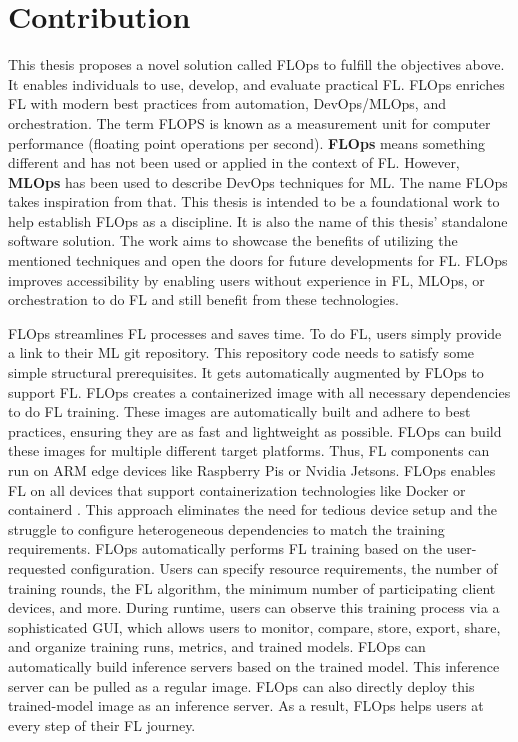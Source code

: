 \section{Contribution}

This thesis proposes a novel solution called FLOps to fulfill the objectives above.
It enables individuals to use, develop, and evaluate practical FL.
FLOps enriches FL with modern best practices from automation, DevOps/MLOps, and orchestration.
The term FLOPS is known as a measurement unit for computer performance (floating point operations per second).
\textbf{FLOps} means something different and has not been used or applied in the context of FL.
However, \textbf{MLOps} has been used to describe DevOps techniques for ML.
The name FLOps takes inspiration from that.
This thesis is intended to be a foundational work to help establish FLOps as a discipline.
It is also the name of this thesis' standalone software solution.
The work aims to showcase the benefits of utilizing the mentioned techniques and open the doors for future developments for FL.
FLOps improves accessibility by enabling users without experience in FL, MLOps, or orchestration to do FL and still benefit from these technologies.

FLOps streamlines FL processes and saves time.
To do FL, users simply provide a link to their ML git repository.
This repository code needs to satisfy some simple structural prerequisites.
It gets automatically augmented by FLOps to support FL.
FLOps creates a containerized image with all necessary dependencies to do FL training.
These images are automatically built and adhere to best practices, ensuring they are as fast and lightweight as possible.
FLOps can build these images for multiple different target platforms.
Thus, FL components can run on ARM edge devices like Raspberry Pis or Nvidia Jetsons.
FLOps enables FL on all devices that support containerization technologies like Docker or containerd \cite{containerd_docs}.
This approach eliminates the need for tedious device setup and the struggle to configure heterogeneous dependencies to match the training requirements.
FLOps automatically performs FL training based on the user-requested configuration.
Users can specify resource requirements, the number of training rounds, the FL algorithm, the minimum number of participating client devices, and more.
During runtime, users can observe this training process via a sophisticated GUI, which allows users to monitor, compare, store, export, share, and organize training runs, metrics, and trained models.
FLOps can automatically build inference servers based on the trained model.
This inference server can be pulled as a regular image.
FLOps can also directly deploy this trained-model image as an inference server.
As a result, FLOps helps users at every step of their FL journey.

